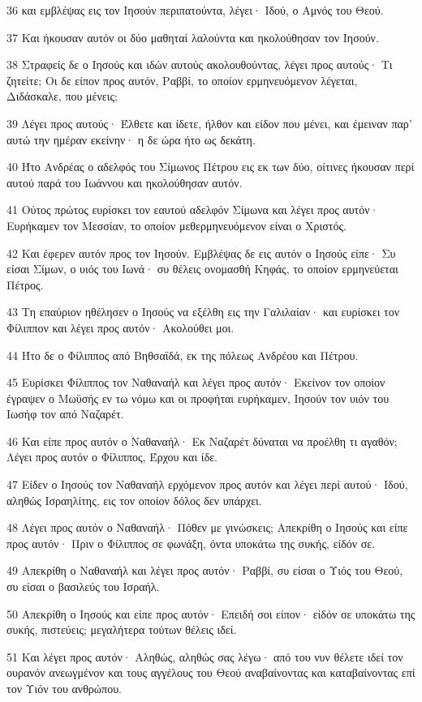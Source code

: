 \par 36 και εμβλέψας εις τον Ιησούν περιπατούντα, λέγει· Ιδού, ο Αμνός του Θεού.
\par 37 Και ήκουσαν αυτόν οι δύο μαθηταί λαλούντα και ηκολούθησαν τον Ιησούν.
\par 38 Στραφείς δε ο Ιησούς και ιδών αυτούς ακολουθούντας, λέγει προς αυτούς· Τι ζητείτε; Οι δε είπον προς αυτόν, Ραββί, το οποίον ερμηνευόμενον λέγεται, Διδάσκαλε, που μένεις;
\par 39 Λέγει προς αυτούς· Έλθετε και ίδετε, ήλθον και είδον που μένει, και έμειναν παρ' αυτώ την ημέραν εκείνην· η δε ώρα ήτο ως δεκάτη.
\par 40 Ήτο Ανδρέας ο αδελφός του Σίμωνος Πέτρου εις εκ των δύο, οίτινες ήκουσαν περί αυτού παρά του Ιωάννου και ηκολούθησαν αυτόν.
\par 41 Ούτος πρώτος ευρίσκει τον εαυτού αδελφόν Σίμωνα και λέγει προς αυτόν· Ευρήκαμεν τον Μεσσίαν, το οποίον μεθερμηνευόμενον είναι ο Χριστός.
\par 42 Και έφερεν αυτόν προς τον Ιησούν. Εμβλέψας δε εις αυτόν ο Ιησούς είπε· Συ είσαι Σίμων, ο υιός του Ιωνά· συ θέλεις ονομασθή Κηφάς, το οποίον ερμηνεύεται Πέτρος.
\par 43 Τη επαύριον ηθέλησεν ο Ιησούς να εξέλθη εις την Γαλιλαίαν· και ευρίσκει τον Φίλιππον και λέγει προς αυτόν· Ακολούθει μοι.
\par 44 Ήτο δε ο Φίλιππος από Βηθσαϊδά, εκ της πόλεως Ανδρέου και Πέτρου.
\par 45 Ευρίσκει Φίλιππος τον Ναθαναήλ και λέγει προς αυτόν· Εκείνον τον οποίον έγραψεν ο Μωϋσής εν τω νόμω και οι προφήται ευρήκαμεν, Ιησούν τον υιόν του Ιωσήφ τον από Ναζαρέτ.
\par 46 Και είπε προς αυτόν ο Ναθαναήλ· Εκ Ναζαρέτ δύναται να προέλθη τι αγαθόν; Λέγει προς αυτόν ο Φίλιππος, Έρχου και ίδε.
\par 47 Είδεν ο Ιησούς τον Ναθαναήλ ερχόμενον προς αυτόν και λέγει περί αυτού· Ιδού, αληθώς Ισραηλίτης, εις τον οποίον δόλος δεν υπάρχει.
\par 48 Λέγει προς αυτόν ο Ναθαναήλ· Πόθεν με γινώσκεις; Απεκρίθη ο Ιησούς και είπε προς αυτόν· Πριν ο Φίλιππος σε φωνάξη, όντα υποκάτω της συκής, είδόν σε.
\par 49 Απεκρίθη ο Ναθαναήλ και λέγει προς αυτόν· Ραββί, συ είσαι ο Υιός του Θεού, συ είσαι ο βασιλεύς του Ισραήλ.
\par 50 Απεκρίθη ο Ιησούς και είπε προς αυτόν· Επειδή σοι είπον· είδόν σε υποκάτω της συκής, πιστεύεις; μεγαλήτερα τούτων θέλεις ιδεί.
\par 51 Και λέγει προς αυτόν· Αληθώς, αληθώς σας λέγω· από του νυν θέλετε ιδεί τον ουρανόν ανεωγμένον και τους αγγέλους του Θεού αναβαίνοντας και καταβαίνοντας επί τον Υιόν του ανθρώπου.

